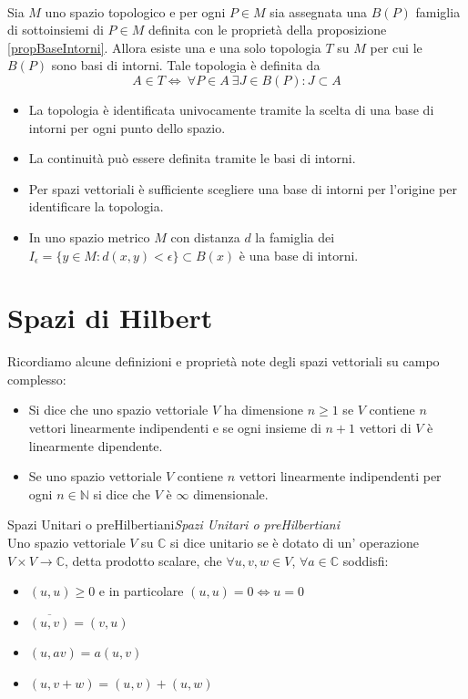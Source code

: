 \documentclass[11pt,a4paper,twoside]{book}
\newenvironment{teorema}[1][\empty]{\begin{Teorema}{
\ifx\empty#1\relax\else\mdseries\itshape#1\\\fi
}{}}{\end{Teorema}}
\newenvironment{definizione}[1][\empty]{\begin{Definizione}{
\ifx\empty#1\relax\else\mdseries\itshape#1\\\fi
}{}}{\end{Definizione}}
\theoremstyle{esss}
\theoremstyle{dotless}
\numberwithin{equation}{section} %
\begin{document}
\begin{teorema}
Sia $M$ uno spazio topologico e per ogni $P\in M$ sia assegnata una $B(P)$ famiglia di sottoinsiemi di $P\in M$ definita con le proprietà della proposizione \ref{propBaseIntorni}. Allora esiste una e una solo topologia $T$ su $M$ per cui le $B(P)$ sono basi di intorni. Tale topologia è definita da \[A\in T \iff \> \forall P\in A\> \exists J\in B(P) : J\subset A\]
\end{teorema}

\begin{itemize}[label=$\cdot$]
\item La topologia è identificata univocamente tramite la scelta di una base di intorni per ogni punto dello spazio.
\item La continuità può essere definita tramite le basi di intorni.
\item Per spazi vettoriali è sufficiente scegliere una base di intorni per l'origine per identificare la topologia.
\item In uno spazio metrico $M$ con distanza $d$ la famiglia dei $I_\epsilon=\{y\in M : d(x,y)<\epsilon\}\subset B(x)$ è una base di intorni.
\end{itemize}

\section{Spazi di Hilbert}

Ricordiamo alcune definizioni e proprietà note degli spazi vettoriali su campo complesso:
\begin{itemize}[label=$\cdot$]
\item Si dice che uno spazio vettoriale $V$ ha dimensione $n\geq1$ se $V$ contiene $n$ vettori linearmente indipendenti e se ogni insieme di $n+1$ vettori di $V$ è linearmente dipendente.
\item Se uno spazio vettoriale $V$ contiene $n$ vettori linearmente indipendenti per ogni $n\in\mathbb{N}$ si dice che $V$ è $\infty$ dimensionale. 
\end{itemize}

\begin{definizione}[Spazi Unitari o preHilbertiani]
Uno spazio vettoriale $V$ su $\mathbb{C}$ si dice unitario se è dotato di un' operazione $V\times V\rightarrow\mathbb{C}$, detta prodotto scalare, che $\forall u,v,w\in V$, $\forall a\in\mathbb{C}$ soddisfi:\begin{itemize}[label=$\cdot$]
\item $(u,u)\geq 0$ e in particolare $(u,u)=0\iff u=0$
\item $\overline{(u,v)}=(v,u)$
\item $(u,av)=a(u,v)$
\item $(u,v+w)=(u,v)+(u,w)$
\end{itemize}\end{definizione}
\end{document}

